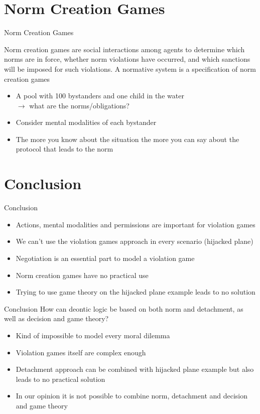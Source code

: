 \documentclass[10pt]{beamer}
\begin{document}
\section[Norm Creation Games]{Norm Creation Games}
\begin{frame}[fragile]{Norm Creation Games}
\begin{definition}
Norm creation games are social interactions
among agents to determine which norms are in force, whether
norm violations have occurred, and which sanctions will
be imposed for such violations. A normative system is a
specification of norm creation games
\end{definition}
\begin{itemize}
    \item A pool with 100 bystanders and one child in the water\\
    $\to$ what are the norms/obligations?
    \item Consider mental modalities of each bystander
    \item The more you know about the situation the more you can say about the protocol that leads to the norm
\end{itemize}

\end{frame}

\section[Conclusion]{Conclusion}
\begin{frame}[fragile]{Conclusion}
\begin{itemize}
    \item Actions, mental modalities and permissions are important for violation games
    \item We can't use the violation games approach in every scenario (hijacked plane)
    \item Negotiation is an essential part to model a violation game
    \item Norm creation games have no practical use
    \item Trying to use game theory on the hijacked plane example leads to no solution
\end{itemize}
\end{frame}

\begin{frame}[fragile]{Conclusion}
 How can deontic logic be based
on both norm and detachment, as well as decision and game
theory?
\begin{itemize}
    \item Kind of impossible to model every moral dilemma
    \item Violation games itself are complex enough
    \item Detachment approach can be combined with hijacked plane example but also leads to no practical solution
    \item In our opinion it is not possible to combine norm, detachment and decision and game theory
\end{itemize}
\end{frame}
\end{document}
